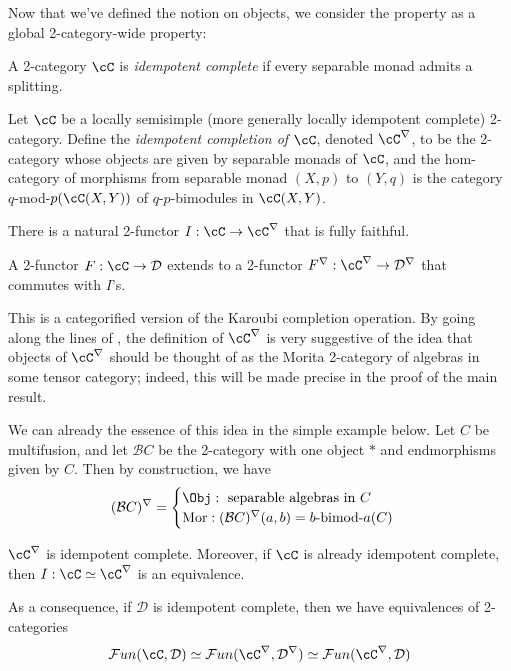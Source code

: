 \documentclass[12pt]{article}
\newcommand{\cB}{{\mathcal{B}}}
\newcommand{\cD}{{\mathcal{D}}}
\newcommand{\cFun}{{\mathcal{F}un}}
\begin{document}
Now that we've defined the notion on objects,
we consider the property as a global 2-category-wide property:


\begin{definition}
A 2-category $\cC$ is \emph{idempotent complete}
if every separable monad admits a splitting.
\end{definition}

\begin{definition}
Let $\cC$ be a locally semisimple
(more generally locally idempotent complete)
2-category.
Define the \emph{idempotent completion of $\cC$},
denoted $\cC^\nabla$, to be the 2-category whose objects
are given by separable monads of $\cC$,
and the hom-category of morphisms from
separable monad $(X,p)$ to $(Y,q)$
is the category $q$-mod-$p(\cC(X,Y))$
of $q$-$p$-bimodules in $\cC(X,Y)$.

There is a natural 2-functor $I: \cC \to \cC^\nabla$
that is fully faithful.

A 2-functor $F: \cC \to \cD$
extends to a 2-functor $F^\nabla: \cC^\nabla \to \cD^\nabla$
that commutes with $I$'s.
\end{definition}

This is a categorified version of the Karoubi completion
operation.
By going along the lines of \cite{Ostrik},
the definition of $\cC^\nabla$
is very suggestive of the idea that
objects of $\cC^\nabla$ should be thought of as
the Morita 2-category of algebras in some tensor category;
indeed, this will be made precise in the proof
of the main result.


We can already the essence of this idea in the simple
example below.
Let $C$ be multifusion,
and let $\cB C$ be the 2-category with one object $*$
and endmorphisms given by $C$.
Then by construction, we have
\[
(\cB C)^\nabla =
\begin{cases}
	\Obj: \text{ separable algebras in } C
	\\
	\text{Mor}: (\cB C)^\nabla (a,b) = b\text{-bimod-}a(C)
\end{cases}
\]



\begin{proposition}
$\cC^\nabla$ is idempotent complete.
Moreover, if $\cC$ is already idempotent complete,
then $I: \cC \simeq \cC^\nabla$ is an equivalence.
\end{proposition}

As a consequence, if $\cD$ is idempotent complete,
then we have equivalences of 2-categories
\[
\cFun(\cC,\cD) \simeq \cFun(\cC^\nabla,\cD^\nabla)
\simeq \cFun(\cC^\nabla, \cD)
\]
\end{document}
